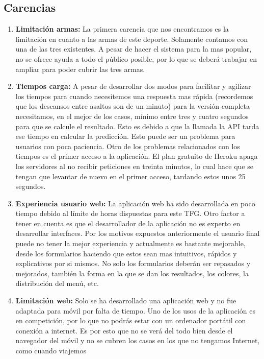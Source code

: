 \subsection{Carencias}
\begin{enumerate}
  \item \textbf{Limitación armas:} La primera carencia que nos encontramos es
    la limitación en cuanto a las armas de este deporte. Solamente contamos
    con una de las tres existentes. A pesar de hacer el sistema para la mas
    popular, no se ofrece ayuda a todo el público posible, por lo que se deberá
    trabajar en ampliar para poder cubrir las tres armas.
  \item \textbf{Tiempos carga:} A pesar de desarrollar dos modos para facilitar
    y agilizar los tiempos para cuando necesitemos una respuesta mas rápida (recordemos
    que los descansos entre asaltos son de un minuto) para la versión completa
    necesitamos, en el mejor de los casos, mínimo entre tres y cuatro segundos
    para que se calcule el resultado. Esto es debido a que la llamada la API
    tarda ese tiempo en calcular la predicción. Esto puede ser un problema para
    usuarios con poca paciencia. Otro de los problemas relacionados con los tiempos
    es el primer acceso a la aplicación. El plan gratuito de Heroku apaga los servidores
    al no recibir peticiones en treinta minutos, lo cual hace que se tengan que levantar
    de nuevo en el primer acceso, tardando estos unos 25 segundos.
  \item \textbf{Experiencia usuario web:} La aplicación web ha sido desarrollada
    en poco tiempo debido al límite de horas dispuestas para este \acs{TFG}. Otro factor
    a tener en cuenta es que el desarrollador de la aplicación no es experto
    en desarrollar interfaces. Por los motivos expuestos anteriormente el usuario
    final puede no tener la mejor experiencia y actualmente es bastante mejorable,
    desde los formularios haciendo que estos sean mas intuitivos, rápidos y explicativos
    por si mismos. No solo los formularios deberán ser repasados y mejorados, también la forma
    en la que se dan los resultados, los colores, la distribución del menú, etc.
  \item \textbf{Limitación web:} Solo se ha desarrollado una aplicación web y no fue
    adaptada para móvil por falta de tiempo. Uno de los usos de la aplicación es
    en competición, por lo que no podrás estar con un ordenador portátil con conexión
    a internet. Es por esto que no se verá del todo bien desde el navegador del móvil
    y no se cubren los casos en los que no tengamos Internet, como cuando viajemos

\end{enumerate}
